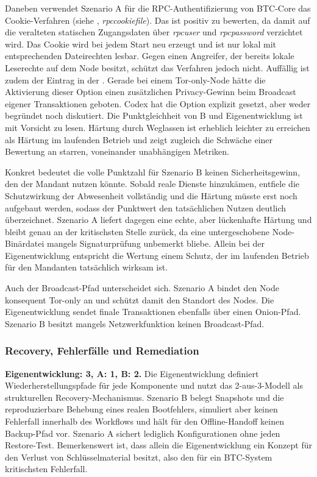 Daneben verwendet Szenario A für die \ac{RPC}-Authentifizierung von \ac{BTC}-Core das Cookie-Verfahren (siehe , \emph{rpccookiefile}). Das ist positiv zu bewerten, da damit auf die veralteten statischen Zugangsdaten über \emph{rpcuser} und \emph{rpcpassword} verzichtet wird. Das Cookie wird bei jedem Start neu erzeugt und ist nur lokal mit entsprechenden
Dateirechten lesbar. Gegen einen Angreifer, der bereits lokale Leserechte auf dem Node besitzt, schützt das Verfahren jedoch nicht.
Auffällig ist zudem der Eintrag  in der . Gerade bei einem Tor-only-Node hätte die Aktivierung dieser Option einen zusätzlichen Privacy-Gewinn beim Broadcast eigener Transaktionen geboten. Codex hat die Option explizit gesetzt, aber weder begründet noch diskutiert.
Die Punktgleichheit von B und Eigenentwicklung ist mit Vorsicht zu lesen. Härtung durch Weglassen ist erheblich leichter zu erreichen als Härtung im laufenden Betrieb und zeigt zugleich die Schwäche einer Bewertung an starren, voneinander unabhängigen Metriken.

Konkret bedeutet die volle Punktzahl für Szenario B keinen Sicherheitsgewinn, den der Mandant nutzen könnte. Sobald reale Dienste hinzukämen, entfiele die Schutzwirkung der Abwesenheit vollständig und die Härtung müsste erst noch aufgebaut werden, sodass der Punktwert den tatsächlichen Nutzen deutlich überzeichnet. Szenario A liefert dagegen eine echte, aber lückenhafte Härtung und bleibt genau an der kritischsten Stelle zurück, da eine untergeschobene Node-Binärdatei mangels Signaturprüfung unbemerkt bliebe. Allein bei der Eigenentwicklung entspricht die Wertung einem Schutz, der im laufenden Betrieb für den Mandanten tatsächlich wirksam ist.

Auch der Broadcast-Pfad unterscheidet sich. 
Szenario A bindet den Node konsequent Tor-only an und schützt damit den Standort des Nodes. Die Eigenentwicklung sendet finale Transaktionen ebenfalls über einen Onion-Pfad.
Szenario B besitzt mangels Netzwerkfunktion keinen Broadcast-Pfad.

\subsubsection{Recovery, Fehlerfälle und Remediation}
\textbf{Eigenentwicklung: 3, A: 1, B: 2.} Die Eigenentwicklung definiert Wiederherstellungspfade für jede Komponente und nutzt das 2-aus-3-Modell als strukturellen Recovery-Mechanismus.
Szenario B belegt Snapshots und die reproduzierbare Behebung eines realen Bootfehlers, simuliert aber keinen Fehlerfall innerhalb des Workflows und hält für den Offline-Handoff keinen Backup-Pfad vor.
Szenario A sichert lediglich Konfigurationen ohne jeden Restore-Test.
Bemerkenswert ist, dass allein die Eigenentwicklung ein Konzept für den Verlust von Schlüsselmaterial besitzt, also den für ein \ac{BTC}-System kritischsten Fehlerfall.

